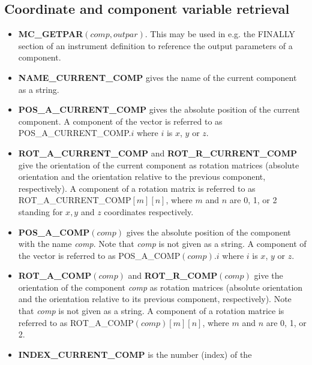 \subsection{Coordinate and component variable retrieval}
\begin{itemize}
\item \textbf{MC\_GETPAR}$(comp, outpar)$. This may be used in e.g. the FINALLY section of an
  instrument definition to reference the output parameters of a
  component.
\item \textbf{NAME\_CURRENT\_COMP} gives the name of the current component as a string.
\item \textbf{POS\_A\_CURRENT\_COMP} gives the absolute position of the
  current component. A component of the vector is referred to as
  POS\_A\_CURRENT\_COMP.$i$ where $i$ is $x$, $y$ or $z$.
\item \textbf{ROT\_A\_CURRENT\_COMP} and
  \textbf{ROT\_R\_CURRENT\_COMP} give the orientation
  of the current component as rotation matrices
  (absolute orientation and the orientation relative to
  the previous component, respectively). A
  component of a rotation matrix is referred to as
  ROT\_A\_CURRENT\_COMP$[m][n]$, where $m$ and
  $n$ are 0, 1, or 2 standing for $x,y$ and $z$ coordinates respectively.
\item \textbf{POS\_A\_COMP}$(comp)$ gives the absolute position
  of the component with the name {\em comp}. Note that
  {\em comp} is not given as a string. A component of the
  vector is referred to as POS\_A\_COMP$(comp).i$
  where $i$ is $x$, $y$ or $z$.
\item \textbf{ROT\_A\_COMP}$(comp)$ and
  \textbf{ROT\_R\_COMP}$(comp)$ give the orientation of the
  component {\em comp} as rotation matrices (absolute
  orientation and the orientation relative to its
  previous component, respectively). Note that {\em comp}
  is not given as a string. A component of  a rotation
  matrice is referred to as
  ROT\_A\_COMP$(comp)[m][n]$, where $m$ and $n$ are
  0, 1, or 2.
\item \textbf{INDEX\_CURRENT\_COMP} is the number (index) of the

\end{itemize}
